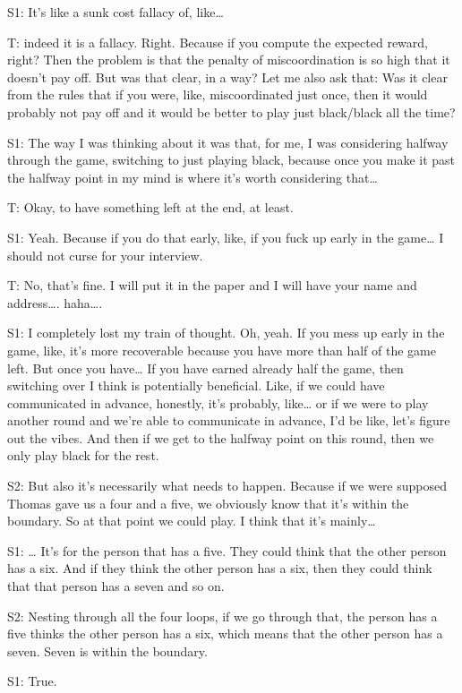 S1: It's like a sunk cost fallacy of, like… 

T: indeed it is a fallacy. Right. Because if you compute the expected reward, right? Then the problem is that the penalty of miscoordination is so high that it doesn't pay off. But was that clear, in a way? Let me also ask that: Was it clear from the rules that if you were, like, miscoordinated just once, then it would probably not pay off and it would be better to play just black/black all the time? 

S1: The way I was thinking about it was that, for me, I was considering halfway through the game, switching to just playing black, because once you make it past the halfway point in my mind is where it's worth considering that…

T: Okay, to have something left at the end, at least. 

S1: Yeah. Because if you do that early, like, if you fuck up early in the game… I should not curse for your interview.

T: No, that's fine. I will put it in the paper and I will have your name and address…. haha…. 

S1: I completely lost my train of thought. Oh, yeah. If you mess up early in the game, like, it's more recoverable because you have more than half of the game left. But once you have… If you have earned already half the game, then switching over I think is potentially beneficial. Like, if we could have communicated in advance, honestly, it's probably, like… or if we were to play another round and we're able to communicate in advance, I'd be like, let's figure out the vibes. And then if we get to the halfway point on this round, then we only play black for the rest.

S2: But also it's necessarily what needs to happen. Because if we were supposed Thomas gave us a four and a five, we obviously know that it's within the boundary. So at that point we could play. I think that it’s mainly…

S1: … It’s for the person that has a five. They could think that the other person has a six. And if they think the other person has a six, then they could think that that person has a seven and so on. 

S2: Nesting through all the four loops, if we go through that, the person has a five thinks the other person has a six, which means that the other person has a seven. Seven is within the boundary. 

S1: True. 

